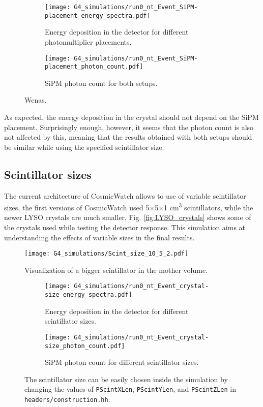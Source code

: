 \begin{figure}[H]
    \centering
    \begin{subfigure}[t]{0.48\textwidth}
      \texttt{[image: G4\_simulations/run0\_nt\_Event\_SiPM-placement\_energy\_spectra.pdf]}
      \caption{\label{sfig:SiPM_place_edep}Energy deposition in the detector for different photomultiplier placements.}
    \end{subfigure}
    \hfill
    \begin{subfigure}[t]{0.48\textwidth}
      \texttt{[image: G4\_simulations/run0\_nt\_Event\_SiPM-placement\_photon\_count.pdf]}
      \caption{\label{sfig:SiPM_place_pcount}SiPM photon count for both setups.}
    \end{subfigure}
    \caption{\label{fig:SiPM_place_results}Wenas.}
\end{figure}

As expected, the energy deposition in the crystal should not depend on the SiPM placement. Surprisingly enough, however, it seems that the photon count is also not affected by this, meaning that the results obtained with both setups should be similar while using the specified scintillator size.

\subsection{Scintillator sizes}\label{sec:Scint_size}

The current architecture of CosmicWatch allows to use of variable scintillator sizes, the first versions of CosmicWatch used 5$\times$5$\times$1 \unit{\cm\cubed} scintillators, while the newer LYSO crystals are much smaller, Fig. \ref{fig:LYSO_crystals} shows some of the crystals used while testing the detector response. This simulation aims at understanding the effects of variable sizes in the final results.

\begin{figure}
  \centering
    \texttt{[image: G4\_simulations/Scint\_size\_10\_5\_2.pdf]}
  \caption{\label{fig:Scint_10_5_2}Visualization of a bigger scintillator in the mother volume.}
\end{figure}

\begin{figure}
  \centering
  \begin{subfigure}[t]{0.48\textwidth}
    \texttt{[image: G4\_simulations/run0\_nt\_Event\_crystal-size\_energy\_spectra.pdf]}
    \caption{\label{sfig:scint_size_edep}Energy deposition in the detector for different scintillator sizes.}
  \end{subfigure}
  \hfill
  \begin{subfigure}[t]{0.48\textwidth}
    \texttt{[image: G4\_simulations/run0\_nt\_Event\_crystal-size\_photon\_count.pdf]}
    \caption{\label{sfig:scint_size_pcount}SiPM photon count for different scintillator sizes.}
  \end{subfigure}
  \caption{\label{fig:scint_size_results}The scintillator size can be easily chosen inside the simulation by changing the values of \texttt{PScintXLen}, \texttt{PScintYLen}, and \texttt{PScintZLen} in \texttt{headers/construction.hh}.}
\end{figure}

